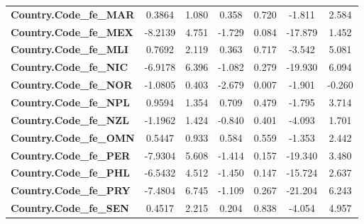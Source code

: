 \begin{center}
\begin{tabular}{lcccccc}
\textbf{Country.Code\_fe\_MAR}                            &       0.3864  &        1.080     &     0.358  &         0.720        &       -1.811    &        2.584     \\
\textbf{Country.Code\_fe\_MEX}                            &      -8.2139  &        4.751     &    -1.729  &         0.084        &      -17.879    &        1.452     \\
\textbf{Country.Code\_fe\_MLI}                            &       0.7692  &        2.119     &     0.363  &         0.717        &       -3.542    &        5.081     \\
\textbf{Country.Code\_fe\_NIC}                            &      -6.9178  &        6.396     &    -1.082  &         0.279        &      -19.930    &        6.094     \\
\textbf{Country.Code\_fe\_NOR}                            &      -1.0805  &        0.403     &    -2.679  &         0.007        &       -1.901    &       -0.260     \\
\textbf{Country.Code\_fe\_NPL}                            &       0.9594  &        1.354     &     0.709  &         0.479        &       -1.795    &        3.714     \\
\textbf{Country.Code\_fe\_NZL}                            &      -1.1962  &        1.424     &    -0.840  &         0.401        &       -4.093    &        1.701     \\
\textbf{Country.Code\_fe\_OMN}                            &       0.5447  &        0.933     &     0.584  &         0.559        &       -1.353    &        2.442     \\
\textbf{Country.Code\_fe\_PER}                            &      -7.9304  &        5.608     &    -1.414  &         0.157        &      -19.340    &        3.480     \\
\textbf{Country.Code\_fe\_PHL}                            &      -6.5432  &        4.512     &    -1.450  &         0.147        &      -15.724    &        2.637     \\
\textbf{Country.Code\_fe\_PRY}                            &      -7.4804  &        6.745     &    -1.109  &         0.267        &      -21.204    &        6.243     \\
\textbf{Country.Code\_fe\_SEN}                            &       0.4517  &        2.215     &     0.204  &         0.838        &       -4.054    &        4.957     \\
\bottomrule
\end{tabular}
\end{center}
